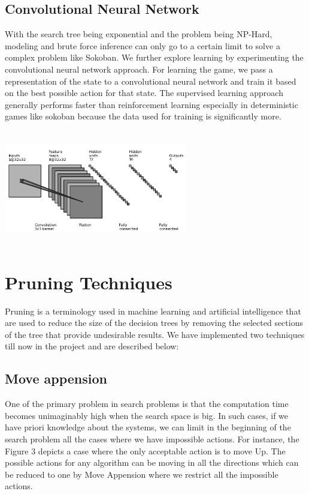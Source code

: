 \documentclass[10pt, final]{article}
\begin{document}
\begin{multicols}{2}
	\subsection{Convolutional Neural Network}
	With the search tree being exponential and the problem being NP-Hard, modeling and brute force inference can only go to a certain limit to solve a complex problem like Sokoban. We further explore learning by experimenting the convolutional neural network approach. For learning the game, we pass a representation of the state to a convolutional neural network and train it based on the best possible action for that state. The supervised learning approach generally performs faster than reinforcement learning especially in deterministic games like sokoban because the data used for training is significantly more.
		\begin{center}
		\includegraphics[width=8cm, height=5cm]{Network.png}
	\end{center}
	\section{Pruning Techniques}
	Pruning is a terminology used in machine learning and artificial intelligence that are used to reduce the size of the decision trees by removing the selected sections of the tree that provide undesirable results. We have implemented two techniques till now in the project and are described below:
	\subsection{Move appension}
	One of the primary problem in search problems is that the computation time becomes unimaginably high when the search space is big. In such cases, if we have priori knowledge about the systems, we can limit in the beginning of the search problem all the cases where we have impossible actions. For instance, the Figure 3 depicts a case where the only acceptable action is to move Up. The possible actions for any algorithm can be moving in all the directions which can be reduced to one by Move Appension where we restrict all the impossible actions. 

\end{multicols}
\end{document}
